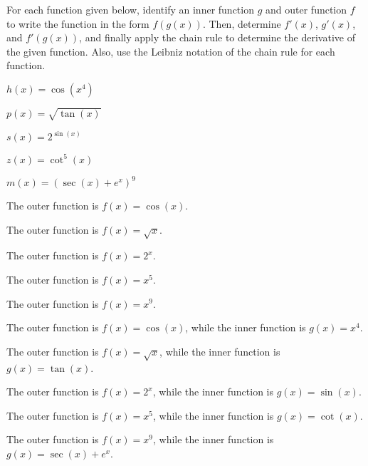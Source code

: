 \begin{activity} \label{A:2.5.1}  
For each function given below, identify an inner function $g$ and outer function $f$ to write the function in the form $f(g(x))$.  Then, determine $f'(x)$, $g'(x)$, and $f'(g(x))$, and finally apply the chain rule to determine the derivative of the given function. Also, use the Leibniz notation of the chain rule for each function. 
\ba
	   \item $h(x) = \cos(x^4)$
	   \item  $p(x) = \sqrt{ \tan(x) }$
           \item $s(x) = 2^{\sin(x)}$
           \item $z(x) = \cot^5(x)$
           \item $m(x) = (\sec(x) + e^x)^9$
\ea
\end{activity}
\begin{smallhint}
\ba
	   \item The outer function is $f(x) = \cos(x)$.
	   \item The outer function is $f(x) = \sqrt{x}$.
           \item The outer function is $f(x) = 2^x$.
           \item The outer function is $f(x) = x^5$.
           \item The outer function is $f(x) = x^9$.
\ea
\end{smallhint}
\begin{bighint}
\ba
	   \item The outer function is $f(x) = \cos(x)$, while the inner function is $g(x) = x^4$.
	   \item The outer function is $f(x) = \sqrt{x}$, while the inner function is $g(x) = \tan(x)$.
           \item The outer function is $f(x) = 2^x$, while the inner function is $g(x) = \sin(x)$.
           \item The outer function is $f(x) = x^5$, while the inner function is $g(x) = \cot(x)$.
           \item The outer function is $f(x) = x^9$, while the inner function is $g(x) = \sec(x) + e^x$.
\ea
\end{bighint}
